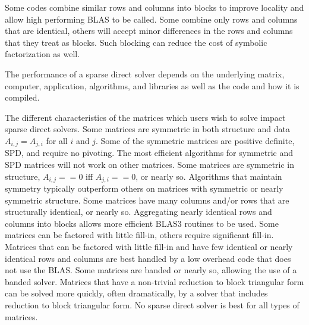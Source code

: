 \documentclass[acmtocl]{acmtrans2m}
\begin{document}
Some codes combine similar rows and columns into blocks to improve
locality and allow high performing BLAS to be called.  Some combine
only rows and columns that are identical, others will accept minor
differences in the rows and columns that they treat as blocks.  Such
blocking can reduce the cost of symbolic factorization as well\cite{amestoy01analysis}.

The performance of a sparse direct solver depends on the underlying
matrix, computer, application, algorithms, and libraries as well as
the code and how it is compiled.  

The different characteristics of the matrices which users wish to
solve impact sparse direct solvers.  Some matrices are symmetric in both
structure and data $A_{i,j} = A_{j,i}$ for all $i$ and $j$.  Some of
the symmetric matrices are positive definite, SPD, and require no
pivoting.  The most efficient algorithms for symmetric and SPD
matrices will not work on other matrices.  Some matrices are symmetric in
structure, $A_{i,j} == 0$ iff $A_{j,i} == 0$, or nearly so.
Algorithms that maintain symmetry typically outperform others on
matrices with symmetric or nearly symmetric structure.  Some matrices have many
columns and/or rows that are structurally identical, or nearly so.
Aggregating nearly identical rows and columns into blocks allows more
efficient BLAS3 routines to be used.  Some matrices can be factored with little
fill-in, others require significant fill-in.  Matrices that can be
factored with little fill-in and have few identical or nearly identical
rows and columns are best handled by a low overhead code that does not
use the BLAS.  Some matrices are banded or nearly so, allowing the use
of a banded solver.  Matrices that have a non-trivial reduction to
block triangular form can be solved more quickly, often dramatically,
by a solver that includes reduction to block triangular form.  No sparse direct solver is best for all types of matrices.  
\end{document}
